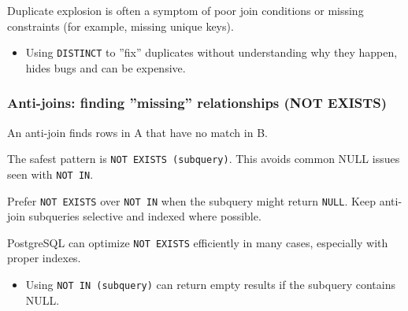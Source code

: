 \E Duplicate explosion is often a symptom of poor join conditions or missing constraints 
(for example, missing unique keys).

\Pitfall
\begin{itemize}
  \item Using \texttt{DISTINCT} to ''fix'' duplicates without understanding why they happen, hides 
  bugs and can be expensive.
\end{itemize}

\subsubsection{Anti-joins: finding ''missing'' relationships (NOT EXISTS)}
\J An anti-join finds rows in A that have no match in B.

\M The safest pattern is \texttt{NOT EXISTS (subquery)}. This avoids common NULL issues seen with 
\texttt{NOT IN}.

\Sx Prefer \texttt{NOT EXISTS} over \texttt{NOT IN} when the subquery might return \texttt{NULL}. 
Keep anti-join subqueries selective and indexed where possible.

\E PostgreSQL can optimize \texttt{NOT EXISTS} efficiently in many cases, especially with proper 
indexes.

\Pitfall
\begin{itemize}
  \item Using \texttt{NOT IN (subquery)} can return empty results if the subquery contains NULL.
\end{itemize}